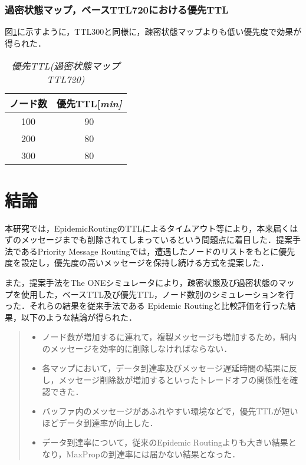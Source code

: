 \documentclass[11pt]{icsthesis}
\begin{document}
\subsection{過密状態マップ，ベースTTL720における優先TTL}
図\ref{priorityTTL_kamitsu720}に示すように，TTL300と同様に，疎密状態マップよりも低い優先度で効果が得られた．
\begin{table}[H]
	\begin{center}
			 \caption[]{\it{優先TTL(過密状態マップ TTL720)}}
			 \label{priorityTTL_kamitsu720}
			 \begin{tabular}{|c|c|}
 \hline
 ノード数&優先TTL[\it{min}]\\
 \hline
 100&90\\
 \hline
 200&80\\
 \hline
 300&80\\
 \hline
			 \end{tabular}
		 \end{center}
 \end{table}
\newpage
\chapter{結論}
本研究では，EpidemicRoutingのTTLによるタイムアウト等により，本来届くはずのメッセージまでも削除されてしまっているという問題点に着目した．提案手法であるPriority Message Routingでは，遭遇したノードのリストをもとに優先度を設定し，優先度の高いメッセージを保持し続ける方式を提案した．

また，提案手法をThe ONEシミュレータにより，疎密状態及び過密状態のマップを使用した，ベースTTL及び優先TTL，ノード数別のシミュレーションを行った．それらの結果を従来手法である
Epidemic Routingと比較評価を行った結果，以下のような結論が得られた．

\begin{quote}
 \begin{itemize}
  \item ノード数が増加するに連れて，複製メッセージも増加するため，網内のメッセージを効率的に削除しなければならない．
  \item 各マップにおいて，データ到達率及びメッセージ遅延時間の結果に反し，メッセージ削除数が増加するといったトレードオフの関係性を確認できた．
  \item バッファ内のメッセージがあふれやすい環境などで，優先TTLが短いほどデータ到達率が向上した．
  \item データ到達率について，従来のEpidemic Routingよりも大きい結果となり，MaxPropの到達率には届かない結果となった．
 \end{itemize}
\end{quote}
\end{document}
